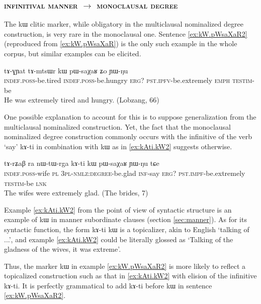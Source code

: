 \documentclass[oldfontcommands,oneside,a4paper,11pt]{article}
\newcommand{\ipa}[1]{{\phon #1}} %
\begin{document}
 
 \subsubsection{ \textsc{infinitival manner} $\rightarrow$  \textsc{monoclausal degree}} \label{sec:manner2adj}
The  \ipa{kɯ} clitic marker, while obligatory in the multiclausal nominalized degree construction, is very rare in the monoclausal one. Sentence \ref{ex:kW.pWsaXaR2}  (reproduced from \ref{ex:kW.pWsaXaR}) is the only such example in the whole corpus, but similar examples can be elicited.

      \begin{exe}
  \ex  \label{ex:kW.pWsaXaR2}  
  \gll 
   \ipa{tɤ-ɣɲat}  	\ipa{tɤ-mtsɯr}  	\ipa{kɯ}  	\ipa{pɯ-saχaʁ}  	\ipa{ʑo}  	\ipa{ɲɯ-ŋu}  \\
      \textsc{indef.poss}-be.tired     \textsc{indef.poss}-be.hungry \textsc{erg?} \textsc{pst.ipfv}-be.extremely \textsc{emph} \textsc{testim}-be \\
      \glt He was extremely tired and hungry. (Lobzang, 66)
   \end{exe} 

One possible explanation to account for this is to suppose generalization from the multiclausal nominalized construction. Yet, the fact that the monoclausal nominalized degree construction commonly occurs with the infinitive of the verb `say' \ipa{kɤ-ti} in combination with   \ipa{kɯ} as in \ref{ex:kAti.kW2}  suggests otherwise.
      \begin{exe}
  \ex  \label{ex:kAti.kW2}  
  \gll 
\ipa{tɤ-rʑaβ} 	\ipa{ra} 	 	\ipa{nɯ-tɯ-rga} 	\ipa{kɤ-ti} 	\ipa{kɯ} 	\ipa{pɯ-saχaʁ} 	\ipa{ɲɯ-ŋu} 	\ipa{tɕe} \\
\textsc{indef.poss}-wife \textsc{pl} \textsc{3pl-nmlz:degree}-be.glad \textsc{inf}-say \textsc{erg?} \textsc{pst.impf}-be.extremely \textsc{testim}-be \textsc{lnk} \\
\glt The wifes were extremely glad. (The brides, 7)
   \end{exe} 
   
Example \ref{ex:kAti.kW2}  from the point of view of syntactic structure is an example of \ipa{kɯ} in manner subordinate clauses (section \ref{sec:manner}). As for its syntactic function, the form \ipa{kɤ-ti kɯ} is a topicalizer, akin to English  `talking of ...', and example \ref{ex:kAti.kW2}  could be literally glossed as `Talking of the gladness of the wives, it was extreme'. 
 
Thus, the marker \ipa{kɯ} in example \ref{ex:kW.pWsaXaR2}  is more likely to reflect a topicalized construction such as that in \ref{ex:kAti.kW2}  with elision of the infinitive \ipa{kɤ-ti}. It is perfectly grammatical to add \ipa{kɤ-ti} before \ipa{kɯ} in sentence \ref{ex:kW.pWsaXaR2}. 
\end{document}
